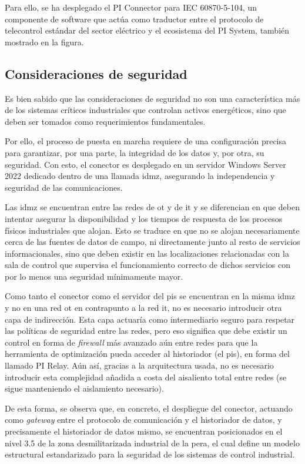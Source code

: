 Para ello, se ha desplegado el PI Connector para IEC 60870-5-104, un componente de software que actúa como traductor entre el protocolo de telecontrol estándar del sector eléctrico y el ecosistema del PI System, también mostrado en la figura.

\subsection{Consideraciones de seguridad}
\label{makereference3.4.2}

Es bien sabido que las consideraciones de seguridad no son una característica más de los sistemas críticos industriales que controlan activos energéticos, sino que deben ser tomados como requerimientos fundamentales.

Por ello, el proceso de puesta en marcha requiere de una configuración precisa para garantizar, por una parte, la integridad de los datos y, por otra, su seguridad. Con esto, el conector es desplegado en un servidor Windows Server 2022 dedicado dentro de una llamada \gls{idmz}, asegurando la independencia y seguridad de las comunicaciones.

Las \gls{idmz} se encuentran entre las redes de \gls{ot} y de \gls{it} y se diferencian en que deben intentar asegurar la disponibilidad y los tiempos de respuesta de los procesos físicos industriales que alojan. Esto se traduce en que no se alojan necesariamente cerca de las fuentes de datos de campo, ni directamente junto al resto de servicios informacionales, sino que deben existir en las localizaciones relacionadas con la sala de control que supervisa el funcionamiento correcto de dichos servicios con por lo menos una seguridad mínimamente mayor.

Como tanto el conector como el servidor del \gls{pis} se encuentran en la misma \gls{idmz} y no en una red \gls{ot} en contrapunto a la red \gls{it}, no es necesario introducir otra capa de indirección. Esta capa actuaría como intermediario seguro para respetar las políticas de seguridad entre las redes, pero eso significa que debe existir un control en forma de \textit{firewall} más avanzado aún entre redes para que la herramienta de optimización pueda acceder al historiador (el \gls{pis}), en forma del llamado PI Relay. Aún así, gracias a la arquitectura usada, no es necesario introducir esta complejidad añadida a costa del aisaliento total entre redes (se sigue manteniendo el aislamiento necesario).

De esta forma, se observa que, en concreto, el despliegue del conector, actuando como \textit{gateway} entre el protocolo de comunicación y el historiador de datos, y precisamente el historiador de datos mismo, se encuentran posicionados en el nivel 3.5 de la zona desmilitarizada industrial de la \gls{pera}, el cual define un modelo estructural estandarizado para la seguridad de los sistemas de control industrial.

